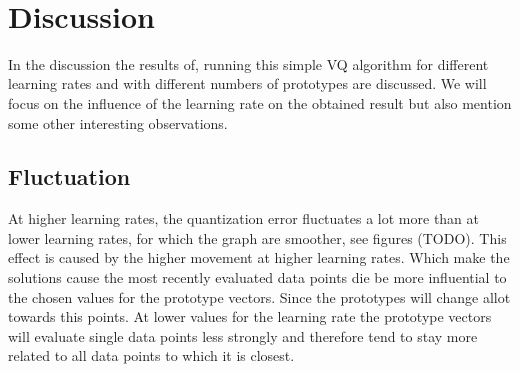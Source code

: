 \documentclass[10pt,a4paper]{article}
\begin{document}
 \\

\section{Discussion}
In the discussion the results of, running this simple VQ algorithm for different learning rates and with different numbers of prototypes are discussed. We will focus on the influence of the learning rate on the obtained result but also mention some other interesting observations.

\subsection{Fluctuation}
At higher learning rates, the quantization error fluctuates a lot more than at lower learning rates, for which the graph are smoother, see figures (TODO). This effect is caused by the higher movement at higher learning rates. Which make the solutions cause the most recently evaluated data points die be more influential to the chosen values for the prototype vectors. Since the prototypes will change allot towards this points. At lower values for the learning rate the prototype vectors will evaluate single data points less strongly and therefore tend to stay more related to all data points to which it is closest.
\end{document}
